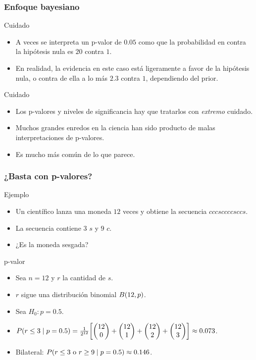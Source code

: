 \documentclass[table]{beamer}
\begin{document}
\begin{frame}
    \frametitle{Enfoque bayesiano}
    \begin{alertblock}{Cuidado}
        \begin{itemize}
            \item A veces se interpreta un p-valor de $0.05$ como que la probabilidad en contra la hipótesis nula es $20$ contra $1$.
            \item En realidad, la evidencia en este caso está ligeramente a favor de la hipótesis nula, o contra de ella a lo más $2.3$ contra $1$, dependiendo del prior.
        \end{itemize}
    \end{alertblock}
    \begin{alertblock}{Cuidado}
        \begin{itemize}
            \item Los p-valores y niveles de significancia hay que tratarlos con \emph{extremo} cuidado.
            \item Muchos grandes enredos en la ciencia han sido producto de malas interpretaciones de p-valores.
            \item Es mucho más común de lo que parece.
        \end{itemize}
    \end{alertblock}
\end{frame}

\begin{frame}
    \frametitle{¿Basta con p-valores?}
    \begin{exampleblock}{Ejemplo}
        \begin{itemize}
            \item Un científico lanza una moneda $12$ veces y obtiene la secuencia $cccsccccsccs$.
            \item La secuencia contiene $3$ $s$ y $9$ $c$.
            \item ¿Es la moneda sesgada?
        \end{itemize}
    \end{exampleblock}
    \begin{block}{p-valor}
        \begin{itemize}
            \item Sea $n = 12$ y $r$ la cantidad de $s$.
            \item $r$ sigue una distribución binomial $\binomial{12}{p}$.
            \item Sea $H_{0}: p = 0.5$.
            \item $\prob{r \leq 3 \mid p = 0.5} = \frac{1}{2^{12}} \sparens{\combin{12}{0} + \combin{12}{1} + \combin{12}{2} + \combin{12}{3}} \approx 0.073$.
            \item Bilateral: $\prob{r \leq 3 \text{ o } r \geq 9 \mid p = 0.5} \approx 0.146$.
        \end{itemize}
    \end{block}
\end{frame}
\end{document}

